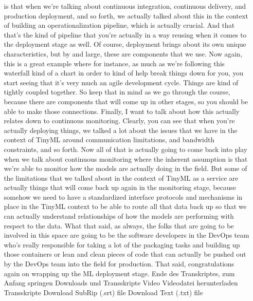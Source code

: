 {{{{{{    is that when we're talking about continuous integration,
    continuous delivery, and production deployment,
    and so forth, we actually talked about this
    in the context of building an operationalization pipeline, which
    is actually crucial.
    And that that's the kind of pipeline that you're actually
    in a way reusing when it comes to the deployment stage as well.
    Of course, deployment brings about its own unique characteristics,
    but by and large, these are components that we use.
    Now again, this is a great example where for instance, as much
    as we're following this waterfall kind of a chart
    in order to kind of help break things down for you,
    you start seeing that it's very much an agile development cycle.
    Things are kind of tightly coupled together.
    So keep that in mind as we go through the course,
    because there are components that will come up in other stages,
    so you should be able to make those connections.
    Finally, I want to talk about how this actually
    relates down to continuous monitoring.
    Clearly, you can see that when you're actually deploying things,
    we talked a lot about the issues that we have in the context of TinyML
    around communication limitations, and bandwidth constraints, and so forth.
    Now all of that is actually going to come back into play
    when we talk about continuous monitoring where the inherent assumption is
    that we're able to monitor how the models are actually doing in the field.
    But some of the limitations that we talked about in the context of TinyML
    as a service are actually things that will come back
    up again in the monitoring stage, because somehow we
    need to have a standardized interface protocols and mechanisms in place
    in the TinyML context to be able to route all that data back
    up so that we can actually understand relationships of how the models are
    performing with respect to the data.
    What that said, as always, the folks that
    are going to be involved in this space are
    going to be the software developers in the DevOps team
    who's really responsible for taking a lot of the packaging tasks
    and building up those containers or lean and clean pieces of code that
    can actually be pushed out by the DevOps team into the field for production.
    That said, congratulations again on wrapping up the ML deployment stage.
    Ende des Transkriptes, zum Anfang springen
    Downloads und Transskripte
    Video
    Videodatei herunterladen
    Transskripte
    Download SubRip (.srt) file
    Download Text (.txt) file        

}}}}}}
